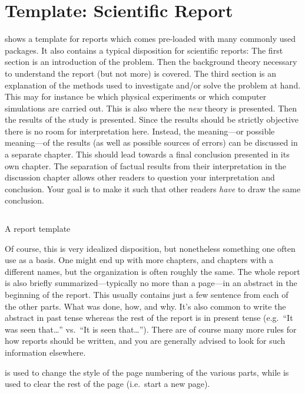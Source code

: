 {\section{Template: Scientific Report}
 shows a template for reports which comes pre-loaded with many commonly used packages. It also contains a typical disposition for scientific reports: The first section is an introduction of the problem. Then the background theory necessary to understand the report (but not more) is covered. The third section is an explanation of the methods used to investigate and/or solve the problem at hand. This may for instance be which physical experiments or which computer simulations are carried out. This is also where the \emph{new} theory is presented. Then the results of the study is presented. Since the results should be strictly objective there is no room for interpretation here. Instead, the meaning---or possible meaning---of the results (as well as possible sources of errors) can be discussed in a separate chapter. This should lead towards a final conclusion presented in its own chapter. The separation of factual results from their interpretation in the discussion chapter allows other readers to question your interpretation and conclusion. Your goal is to make it such that other readers \emph{have} to draw the same conclusion.

\begin{longlisting}
	\inputminted[frame=lines,linenos]{latex}{latex/report.tex}
	\caption{A report template}
	\label{lst:latex:report}
\end{longlisting}

Of course, this is very idealized disposition, but nonetheless something one often use as a basis. One might end up with more chapters, and chapters with a different names, but the organization is often roughly the same. The whole report is also briefly summarized---typically no more than a page---in an abstract in the beginning of the report. This usually contains just a few sentence from each of the other parts. What was done, how, and why. It's also common to write the abstract in past tense whereas the rest of the report is in present tense (e.g.\ ``It was seen that\ldots'' vs.\ ``It is seen that\ldots''). There are of course many more rules for how reports should be written, and you are generally advised to look for such information elsewhere.

\latexin{\pagenumbering} is used to change the style of the page numbering of the various parts, while \latexin{\clearpage} is used to clear the rest of the page (i.e.\ start a new page).

}
